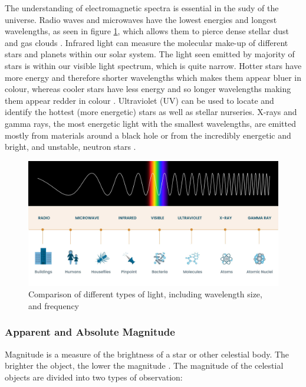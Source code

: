 \documentclass[12pt]{article}
\begin{document}
The understanding of electromagnetic spectra is essential in the sudy of the universe. Radio waves and microwaves have the lowest energies and longest wavelengths, as seen in
figure \ref{fig:wavelength}, which allows them to pierce dense stellar dust and gas clouds
\cite{hubblespectra}.
Infrared light can measure the molecular make-up of different stars and planets within our solar system.
The light seen emitted by majority of stars is within our visible light spectrum, which is quite narrow. Hotter stars have more energy and therefore shorter wavelengths
which makes them appear bluer in colour, whereas cooler stars have less energy and so longer wavelengths making them appear redder in colour
\cite{hubblespectra}.
Ultraviolet (UV) can be used to locate and identify the hottest (more energetic) stars as well as stellar nurseries.
X-rays and gamma rays, the most energetic light with the smallest wavelengths, are emitted mostly from materials around a black hole or from
the incredibly energetic and bright, and unstable, neutron stars
\cite{hubblespectra}.

\begin{figure}[H]
    \centering
    \includegraphics[width=15cm]{light waves.jpg}
    \caption{\centering \footnotesize{Comparison of different types of light, including wavelength size, and frequency \protect\cite{hubblespectra}}}
    \label{fig:wavelength}
\end{figure}

\vspace{1cm}

\subsubsection{Apparent and Absolute Magnitude} \label{sec:1.2.1}

Magnitude is a measure of the brightness of a star or other celestial body. The brighter the object, the lower the magnitude
\cite{britmag}.
The magnitude of the celestial objects are divided into two types of observation:
\end{document}
